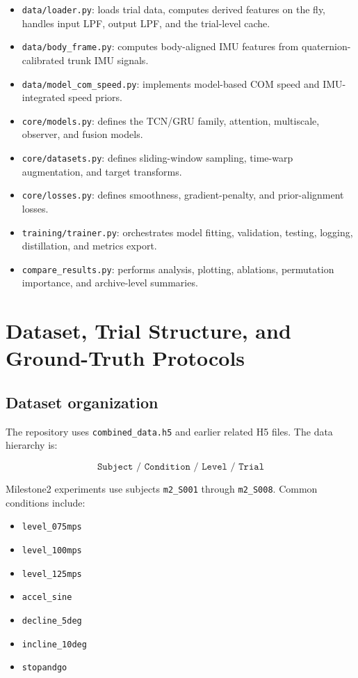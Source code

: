 \documentclass[11pt,a4paper]{article}
\begin{document}
\begin{itemize}
\item \texttt{data/loader.py}: loads trial data, computes derived features on the fly, handles input LPF, output LPF, and the trial-level cache.
\item \texttt{data/body\_frame.py}: computes body-aligned IMU features from quaternion-calibrated trunk IMU signals.
\item \texttt{data/model\_com\_speed.py}: implements model-based COM speed and IMU-integrated speed priors.
\item \texttt{core/models.py}: defines the TCN/GRU family, attention, multiscale, observer, and fusion models.
\item \texttt{core/datasets.py}: defines sliding-window sampling, time-warp augmentation, and target transforms.
\item \texttt{core/losses.py}: defines smoothness, gradient-penalty, and prior-alignment losses.
\item \texttt{training/trainer.py}: orchestrates model fitting, validation, testing, logging, distillation, and metrics export.
\item \texttt{compare\_results.py}: performs analysis, plotting, ablations, permutation importance, and archive-level summaries.
\end{itemize}

\section{Dataset, Trial Structure, and Ground-Truth Protocols}

\subsection{Dataset organization}

The repository uses \texttt{combined\_data.h5} and earlier related H5 files. The data hierarchy is:

\[
\texttt{Subject / Condition / Level / Trial}
\]

Milestone2 experiments use subjects \texttt{m2\_S001} through \texttt{m2\_S008}. Common conditions include:

\begin{itemize}
\item \texttt{level\_075mps}
\item \texttt{level\_100mps}
\item \texttt{level\_125mps}
\item \texttt{accel\_sine}
\item \texttt{decline\_5deg}
\item \texttt{incline\_10deg}
\item \texttt{stopandgo}
\end{itemize}
\end{document}
